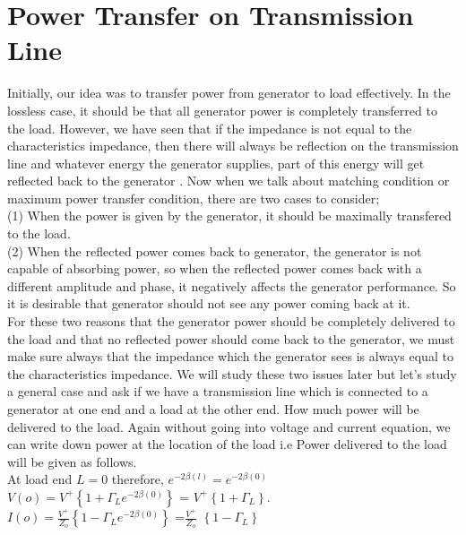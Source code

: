 \section{Power Transfer on Transmission Line}
Initially, our idea was to transfer power from generator to load effectively. In the lossless case, it should be that all generator power is completely transferred to the load. However, we have seen that if the impedance is not equal to the characteristics impedance, then there will always be reflection on the transmission line and whatever energy the generator supplies, part of this energy will get reflected back to the generator . Now when we talk about matching condition or maximum power transfer condition, there are two cases to consider;\\

 (1) When the power is given by the generator, it should be maximally transfered to the load.\\
 
  (2) When the reflected power comes back to generator, the generator is not capable of absorbing power, so when the reflected power comes back with a different amplitude and phase, it negatively affects the generator performance. So it is desirable that generator should not see any power coming back at it.\\
  
   For these two reasons that the generator power should be completely delivered to the load and that no reflected power should come back to the generator, we must make sure always that the impedance which the generator sees is always equal to the characteristics impedance. We will study these two issues later but let's study a general case and ask if we have a transmission line which is connected to a generator at  one end and a load at the other end. How much power will be delivered to the load. Again without going into voltage and current equation, we can write down power at the location of the load i.e Power delivered to the load will be given as follows.\\

At load end $L=0$ therefore, $e^{-2\beta (l)} = e^{-2\beta (0)}$\\

$V(o)= V^{+} \left\lbrace {1 + \Gamma_L e^{-2\beta(0)}}\right\rbrace $ = $V^{+}\left\lbrace 1 +\Gamma_L \right\rbrace$.
\\

$I(o)= \frac{V^{+}}{Z_o} \left\lbrace {1 - \Gamma_L e^{-2\beta(0)}}\right\rbrace $ =$ \frac{V^{+}}{Z_o}$ $\left\lbrace 1 -\Gamma_L \right\rbrace$ \\

